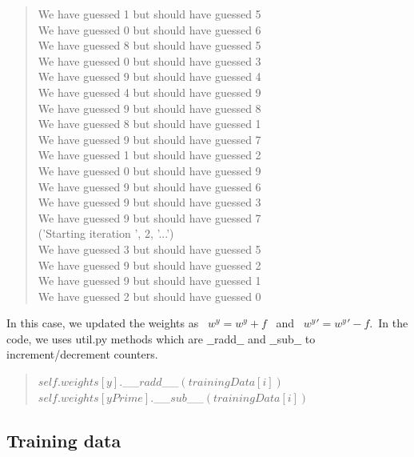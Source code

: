 \documentclass{article}
\begin{document}
\begin{quote}
        We have guessed 1 but should have guessed 5\\
        We have guessed 0 but should have guessed 6\\
        We have guessed 8 but should have guessed 5\\
        We have guessed 0 but should have guessed 3\\
        We have guessed 9 but should have guessed 4\\
        We have guessed 4 but should have guessed 9\\
        We have guessed 9 but should have guessed 8\\
        We have guessed 8 but should have guessed 1\\
        We have guessed 9 but should have guessed 7\\
        We have guessed 1 but should have guessed 2\\
        We have guessed 0 but should have guessed 9\\
        We have guessed 9 but should have guessed 6\\
        We have guessed 9 but should have guessed 3\\
        We have guessed 9 but should have guessed 7\\
        ('Starting iteration ', 2, '...')\\
        We have guessed 3 but should have guessed 5\\
        We have guessed 9 but should have guessed 2\\
        We have guessed 9 but should have guessed 1\\
        We have guessed 2 but should have guessed 0\\
        \end{quote}
            
        In this case, we updated the weights as \ $w^y = w^y + f$ \ and \ $w^y' = w^y' - f$.\ In the code, we uses util.py methods which are $\_\_$radd$\_\_$ and $\_\_$sub$\_\_$ to increment/decrement counters.
        \begin{quote}
            $self.weights[y].$\_\_$radd$\_\_$(trainingData[i])$\\
            $self.weights[yPrime].$\_\_$sub$\_\_$(trainingData[i])$
        \end{quote}
            
    \subsection{Training data}
\end{document}
